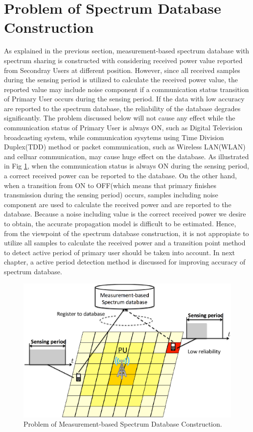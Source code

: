 \section{Problem of Spectrum Database Construction }
As explained in the previous section, measurement-based spectrum database with spectrum sharing is constructed with considering received power value reported from Secondray Users at different position. However, since all received samples during the sensing period is utilized to calculate the received power value, the reported value may include noise component if a communication status transition of Primary User occurs during the sensing period. If the data with low accuracy are reported to the spectrum database, the reliability of the database degrades significantly. The problem discussed below will not cause any effect while the communication status of Primary User is always ON, such as Digital Television broadcasting system, while communication sysytems using Time Division Duplex(TDD) method or packet communication, such as Wireless LAN(WLAN) and celluar communication, may cause huge effect on the database. As illustrated in Fig \ref{fig:transition}, when the communication status is always ON during the sensing period, a correct received power can be reported to the database. On the other hand, when a transition from ON to OFF(which means that primary finishes transmission during the sensing period) occurs, samples including noise component are used to calculate the received power and are reported to the database. Because a noise including value is the correct received power we desire to obtain, the accurate propagation model is difficult to be estimated. Hence, from the viewpoint of the spectrum database construction, it is not appropiate to utilize all samples to calculate the received power and a transition point method to detect active period of primary user should be taken into account. In next chapter, a active period detection method is discussed for improving accuracy of spectrum database.

\begin{figure}[!htp]
\begin{center}
\includegraphics[width=150mm,clip]{transition.eps}
\caption{Problem of Measurement-based Spectrum Database Construction.}
\label{fig:transition}
\end{center}
\end{figure}
